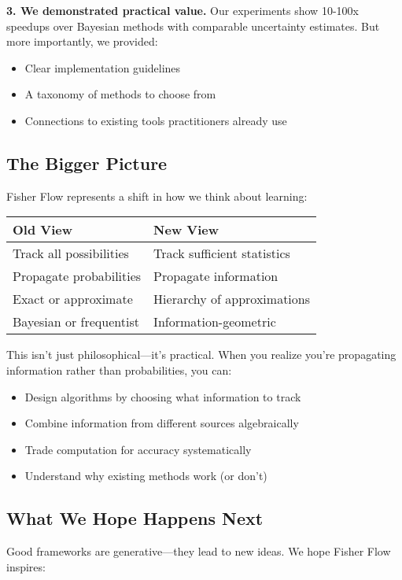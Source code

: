 \documentclass[11pt]{article}
\begin{document}
\textbf{3. We demonstrated practical value.} Our experiments show 10-100x speedups over Bayesian methods with comparable uncertainty estimates. But more importantly, we provided:
\begin{itemize}
\item Clear implementation guidelines
\item A taxonomy of methods to choose from
\item Connections to existing tools practitioners already use
\end{itemize}

\subsection{The Bigger Picture}

Fisher Flow represents a shift in how we think about learning:

\begin{center}
\begin{tabular}{ll}
\textbf{Old View} & \textbf{New View} \\
\hline
Track all possibilities & Track sufficient statistics \\
Propagate probabilities & Propagate information \\
Exact or approximate & Hierarchy of approximations \\
Bayesian or frequentist & Information-geometric \\
\end{tabular}
\end{center}

This isn't just philosophical—it's practical. When you realize you're propagating information rather than probabilities, you can:
\begin{itemize}
\item Design algorithms by choosing what information to track
\item Combine information from different sources algebraically
\item Trade computation for accuracy systematically
\item Understand why existing methods work (or don't)
\end{itemize}

\subsection{What We Hope Happens Next}

Good frameworks are generative—they lead to new ideas. We hope Fisher Flow inspires:
\end{document}
